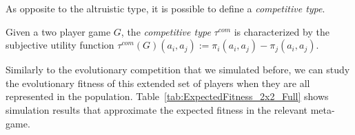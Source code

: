 \documentclass[fleqn,reqno,11pt]{article}
\begin{document}
\noindent As opposite to the altruistic type, it is possible to define a \textit{competitive type}. 

\iffalse

\begin{definition}[Competitive preference] \label{defn:compref}

For a game $ G=\langle N, (A_i , \pi_i)_{i \in N} \rangle $, we define the competitive preference $ \theta^{com}: A \rightarrow \mathbb{R} $ such that $ \theta^{com}(a_i,a_{-i})=\pi(a_i,a_{-i}) - \sum_{j \neq i} \pi(a_{j},a_{-j})$.

\end{definition}

\fi

\begin{definition} \label{defn:comtype}

Given a two player game  $ G $, the \textit{competitive type} $\tau^{com}$ is characterized by the subjective utility function $\tau^{com}(G)(a_i, a_j):=\pi_i(a_i,a_j) - \pi_j(a_i,a_j)$.

\end{definition}

Similarly to the evolutionary competition that we simulated before, we can study the
evolutionary fitness of this extended set of players when they are all represented in the
population. Table~\ref{tab:ExpectedFitness_2x2_Full} shows simulation results that approximate the
expected fitness in the relevant meta-game.
\end{document}
